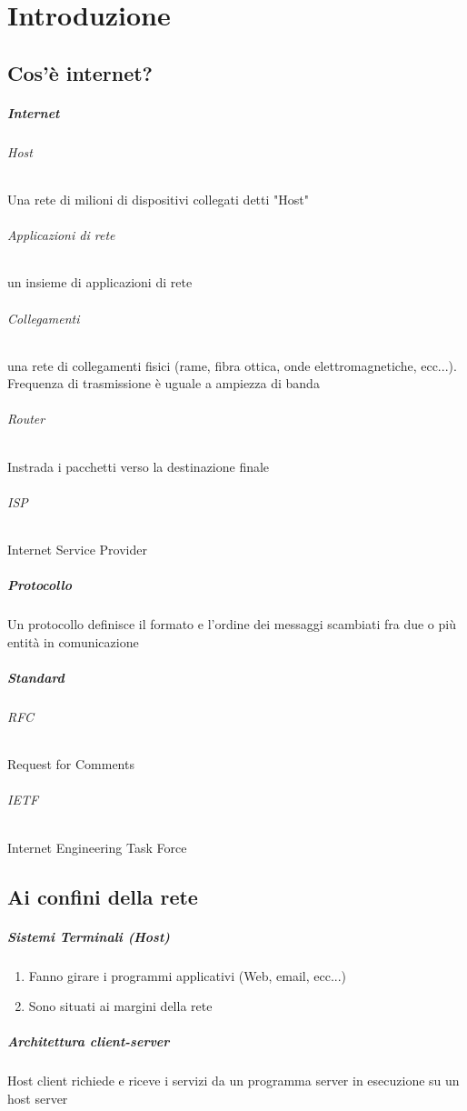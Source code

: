 \setlength{\parskip}{0pt}
\titlespacing*{\subparagraph}{1em}{0em}{0em} 

\chapter{Introduzione}
\thispagestyle{chapterInit}
    \section{Cos'è internet?}
        \paragraph{Internet}
            \subparagraph{Host} Una rete di milioni di dispositivi collegati detti "Host"
            \subparagraph{Applicazioni di rete} un insieme di applicazioni di rete
            \subparagraph{Collegamenti} una rete di collegamenti fisici (rame, fibra ottica, onde elettromagnetiche, ecc...).
                Frequenza di trasmissione è uguale a ampiezza di banda
            \subparagraph{Router} Instrada i pacchetti verso la destinazione finale
            \subparagraph{\Acrshort*{ISP}} Internet Service Provider
        \paragraph{Protocollo} Un protocollo definisce il formato e l’ordine dei messaggi scambiati fra due o più entità in comunicazione 
        \paragraph{Standard} 
            \subparagraph{\Acrshort*{RFC}} Request for Comments
            \subparagraph{\Acrshort*{IETF}} Internet Engineering Task Force
    \section{Ai confini della rete}
        \paragraph{Sistemi Terminali (Host)}
        \begin{enumerate}
            \item Fanno girare i programmi applicativi (Web, email, ecc...)
            \item Sono situati ai margini della rete
        \end{enumerate}
        \paragraph{Architettura client-server} Host client richiede e riceve i servizi da un programma server in esecuzione su un host server
